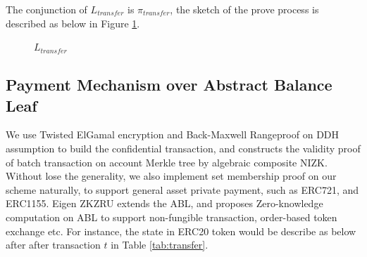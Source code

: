 \documentclass{article}
\begin{document}
The conjunction of $L_{transfer}$ is $\pi_{transfer}$, the sketch of the prove process is described as below in Figure \ref{fig:pi_transfer}.
\begin{figure}[H]
    \centering
    \caption{${L_{transfer}}$}
    \label{fig:pi_transfer}
\end{figure}

\subsection{Payment Mechanism over Abstract Balance Leaf} \label{section:pay-abl}

We use Twisted ElGamal encryption \cite{chen2020pgc} and Back-Maxwell Rangeproof \cite{10.1007/978-3-662-58820-8_4} on DDH assumption to build the confidential transaction, and constructs the validity proof of batch transaction on account Merkle tree by algebraic composite NIZK. Without lose the generality, we also implement set membership proof on our scheme naturally, to support general asset private payment, such as ERC721, and ERC1155. Eigen ZKZRU extends the ABL, and proposes Zero-knowledge computation on ABL to support non-fungible transaction, order-based token exchange etc. For instance, the state in ERC20 token would be describe as below after after transaction $t$ in Table \ref{tab:transfer}. 
\end{document}
